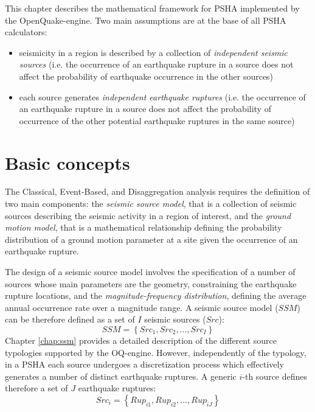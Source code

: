 This chapter describes the mathematical framework for PSHA implemented by the OpenQuake-engine.
Two main assumptions are at the base of all PSHA calculators:
\begin{itemize}
	\item seismicity in a region is described by a collection of \textit{independent seismic sources}
	(i.e. the occurrence of an earthquake rupture in a source does not affect the probability of
	earthquake occurrence in the other sources)
	\item each source generates \textit{independent earthquake ruptures} (i.e. the occurrence of an
	earthquake rupture in a source does not affect the probability of occurrence of the other
	potential earthquake ruptures in the same source)
\end{itemize}

\section{Basic concepts}
The Classical, Event-Based, and Disaggregation analysis requires the definition
of two main components: the \textit{seismic source model}, that is a collection
of seismic sources describing the seismic activity in a region of interest, and
the \textit{ground motion model}, that is a mathematical relationship defining
the probability distribution of a ground motion parameter at a site given the
occurrence of an earthquake rupture.

The design of a seismic source model involves the specification of a number of
sources whose main parameters are the geometry, constraining the earthquake
rupture locations, and the \textit{magnitude-frequency distribution}, defining
the average annual occurrence rate over a magnitude range. A seismic source
model ($SSM$) can be therefore defined as a set of $I$ seismic sources
($Src$):
\begin{equation}
SSM = \left\{Src_{1}, Src_{2}, ..., Src_{I}\right\}
\end{equation}
Chapter \ref{chap:ssm} provides a detailed description of the different source
typologies supported by the OQ-engine. However, independently of the typology,
in a PSHA each source undergoes a discretization process which effectively
generates a number of distinct earthquake ruptures. A generic $i$-th source
defines therefore a set of $J$ earthquake ruptures:
\begin{equation}
Src_{i} = \left\{Rup_{i1}, Rup_{i2}, ..., Rup_{iJ}\right\}
\end{equation}


